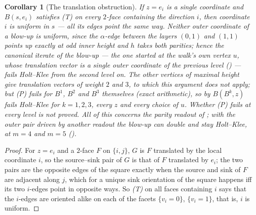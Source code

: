 \documentclass[11pt]{article}
\theoremstyle{plain}
\newtheorem{corollary}[theorem]{Corollary}
\theoremstyle{definition}
\begin{document}
\begin{corollary}[The translation obstruction]\label{cor:blowup-transl}
If $z=e_i$ is a single coordinate and $B(s,e_i)$ satisfies \emph{(T)} on
every $2$-face containing the direction $i$, then coordinate $i$ is
uniform in $s$ --- all its edges point the same way. Neither outer
coordinate of a blow-up is uniform, since the $\alpha$-edge between the
layers $(0,1)$ and $(1,1)$ points up exactly at odd inner height and $h$
takes both parities; hence the canonical iterate of the blow-up --- the
one started at the walk's own vertex $u$, whose translation vector is a
single outer coordinate of the previous level
() --- fails Holt--Klee from the second level
on. The other vertices of maximal height give translation vectors of
weight $2$ and $3$, to which this argument does not apply; but \emph{(P)}
fails for $B^{1}$, $B^{2}$ and $B^{3}$ themselves (exact arithmetic), so
by  $B(B^{k},z)$ fails Holt--Klee for $k=1,2,3$,
every $z$ and every choice of $u$. Whether \emph{(P)} fails at every level
is not proved. All of this concerns the parity readout of
; with the outer pair driven by another readout the
blow-up can double and stay Holt--Klee, at $m=4$ and $m=5$
().
\end{corollary}

\begin{proof}
For $z=e_i$ and a $2$-face $F$ on $\{i,j\}$, $G$ is $F$ translated by the
local coordinate $i$, so the source--sink pair of $G$ is that of $F$
translated by $e_i$; the two pairs are the opposite edges of the square
exactly when the source and sink of $F$ are adjacent along $j$, which for
a unique sink orientation of the square happens iff its two $i$-edges
point in opposite ways. So \emph{(T)} on all faces containing $i$ says
that the $i$-edges are oriented alike on each of the facets
$\{v_i=0\}$, $\{v_i=1\}$, that is, $i$ is uniform.
\end{proof}
\end{document}
